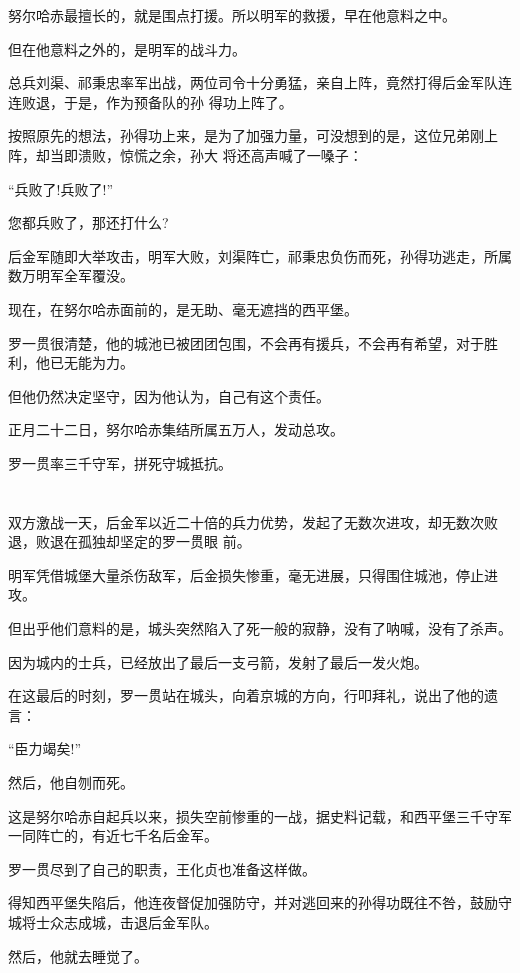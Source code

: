 \documentclass[11pt,a4paper,onecolumn]{article}
\begin{document}
努尔哈赤最擅长的，就是围点打援。所以明军的救援，早在他意料之中。

但在他意料之外的，是明军的战斗力。

总兵刘渠、祁秉忠率军出战，两位司令十分勇猛，亲自上阵，竟然打得后金军队连连败退，于是，作为预备队的孙
得功上阵了。

按照原先的想法，孙得功上来，是为了加强力量，可没想到的是，这位兄弟刚上阵，却当即溃败，惊慌之余，孙大
将还高声喊了一嗓子：

``兵败了!兵败了!''

您都兵败了，那还打什么?

后金军随即大举攻击，明军大败，刘渠阵亡，祁秉忠负伤而死，孙得功逃走，所属数万明军全军覆没。

现在，在努尔哈赤面前的，是无助、毫无遮挡的西平堡。

罗一贯很清楚，他的城池已被团团包围，不会再有援兵，不会再有希望，对于胜利，他已无能为力。

但他仍然决定坚守，因为他认为，自己有这个责任。

正月二十二日，努尔哈赤集结所属五万人，发动总攻。

罗一贯率三千守军，拼死守城抵抗。

\section[\thesection]{}

双方激战一天，后金军以近二十倍的兵力优势，发起了无数次进攻，却无数次败退，败退在孤独却坚定的罗一贯眼
前。

明军凭借城堡大量杀伤敌军，后金损失惨重，毫无进展，只得围住城池，停止进攻。

但出乎他们意料的是，城头突然陷入了死一般的寂静，没有了呐喊，没有了杀声。

因为城内的士兵，已经放出了最后一支弓箭，发射了最后一发火炮。

在这最后的时刻，罗一贯站在城头，向着京城的方向，行叩拜礼，说出了他的遗言：

``臣力竭矣!''

然后，他自刎而死。

这是努尔哈赤自起兵以来，损失空前惨重的一战，据史料记载，和西平堡三千守军一同阵亡的，有近七千名后金军。

罗一贯尽到了自己的职责，王化贞也准备这样做。

得知西平堡失陷后，他连夜督促加强防守，并对逃回来的孙得功既往不咎，鼓励守城将士众志成城，击退后金军队。

然后，他就去睡觉了。
\end{document}
